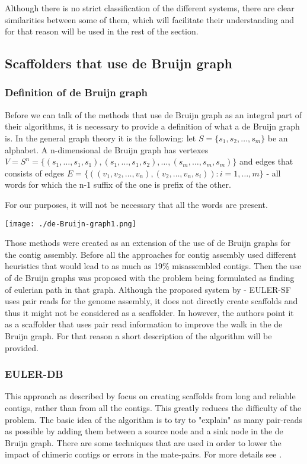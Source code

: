 \documentclass[11pt]{article}
\begin{document}
Although there is no strict classification of the different systems, there are
clear similarities between some of them, which will facilitate their
understanding and for that reason will be used in the rest of the section.

\subsection{Scaffolders that use de Bruijn graph} %
\label{sub:Scaffolders that use de Bruijn graph}

\subsubsection{Definition of de Bruijn graph}
\label{sub:Definition of de Bruijn graph}
Before we can talk of the methods that use de Bruijn graph as an integral part of 
their algorithms, it is necessary to provide a definition of what a de Bruijn graph
is. In the general graph theory it is the following: let $S = \{s_1, s_2, \dots, s_m\}$ be
an alphabet. A n-dimensional de Bruijn graph has vertexes $V = S^n = \{(s_1, \dots, s_1, s_1), 
(s_1, \dots, s_1, s_2), \dots, (s_m, \dots, s_m, s_m)\}$ and edges that consists of
edges $E = \{((v_1, v_2, \dots, v_n), (v_2, \dots, v_n, s_i)) : i = 1, \dots, m\}$ - 
all words for which the n-1 suffix of the one is prefix of the other.

For our purposes, it will not be necessary that all the words are present.

\texttt{[image: ./de-Bruijn-graph1.png]}

Those methods were created as an extension of the use of de Bruijn graphs for
the contig assembly. Before \cite{pevzner} all the approaches for contig
assembly used different heuristics that would lead to as much as 19\%
misassembled contigs. Then the use of de Bruijn graphs was proposed with
the problem being formulated as finding of eulerian path in that graph. Although
the proposed system by \cite{pevzner} - EULER-SF uses pair reads for the genome
assembly, it does not directly create scaffolds and thus it might not be
considered as a scaffolder. In \cite{SOPRA} however, the authors point it as a
scaffolder that uses pair read information to improve the walk in the de Bruijn
graph. For that reason a short description of the algorithm will be provided.

\subsubsection{EULER-DB} %
\label{ssub:EULER-DB}
This approach as described by \cite{pevzner} focus on creating scaffolds from
long and reliable contigs, rather than from all the contigs. This greatly
reduces the difficulty of the problem. The basic idea of the algorithm is to try
to "explain" as many pair-reads as possible by adding them between a source node
and a sink node in the de Bruijn graph. There are some techniques that are used
in order to lower the impact of chimeric contigs or errors in the mate-pairs.
For more details see \cite{pevzner}.
\end{document}
